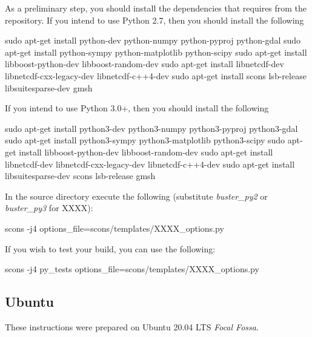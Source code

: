 \noindent As a preliminary step, you should install the dependencies that \esfinley requires from the repository.
If you intend to use Python 2.7, then you should install the following
\begin{shellCode}
sudo apt-get install python-dev python-numpy python-pyproj python-gdal
sudo apt-get install python-sympy python-matplotlib python-scipy
sudo apt-get install libboost-python-dev libboost-random-dev
sudo apt-get install libnetcdf-dev libnetcdf-cxx-legacy-dev libnetcdf-c++4-dev
sudo apt-get install scons lsb-release libsuitesparse-dev gmsh
\end{shellCode}

\noindent If you intend to use Python 3.0+, then you should install the following
\begin{shellCode}
sudo apt-get install python3-dev python3-numpy python3-pyproj python3-gdal
sudo apt-get install python3-sympy python3-matplotlib python3-scipy
sudo apt-get install libboost-python-dev libboost-random-dev
sudo apt-get install libnetcdf-dev libnetcdf-cxx-legacy-dev libnetcdf-c++4-dev
sudo apt-get install libsuitesparse-dev scons lsb-release gmsh
\end{shellCode}

\noindent In the source directory execute the following (substitute \textit{buster_py2} or \textit{buster_py3} for XXXX):
\begin{shellCode}
scons -j4 options_file=scons/templates/XXXX_options.py
\end{shellCode}

\noindent If you wish to test your build, you can use the following:
\begin{shellCode}
scons -j4 py_tests options_file=scons/templates/XXXX_options.py
\end{shellCode}


\subsection{Ubuntu}\label{sec:ubsrc}
These instructions were prepared on Ubuntu 20.04 LTS \textit{Focal Fossa}. \newline


